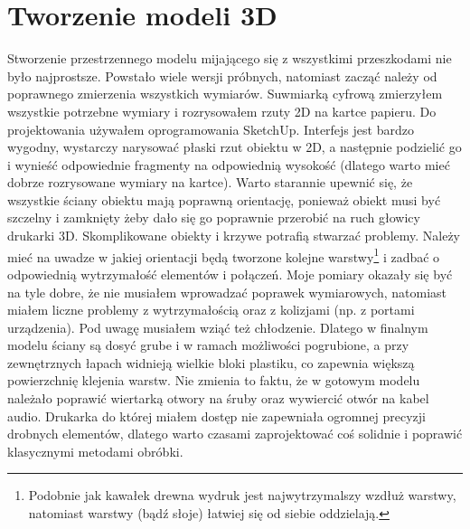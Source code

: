 \documentclass[declaration,shortabstract, inz]{iithesis}
\begin{document}
    
\section{Tworzenie modeli 3D}
\label{section:3d}
    Stworzenie przestrzennego modelu mijającego się z wszystkimi przeszkodami nie było najprostsze. Powstało wiele wersji próbnych, natomiast zacząć należy od poprawnego zmierzenia wszystkich wymiarów. Suwmiarką cyfrową zmierzyłem wszystkie potrzebne wymiary i rozrysowałem rzuty 2D na kartce papieru. Do projektowania używałem oprogramowania SketchUp. Interfejs jest bardzo wygodny, wystarczy narysować płaski rzut obiektu w 2D, a następnie podzielić go i wynieść odpowiednie fragmenty na odpowiednią wysokość (dlatego warto mieć dobrze rozrysowane wymiary na kartce). Warto starannie upewnić się, że wszystkie ściany obiektu mają poprawną orientację, ponieważ obiekt musi być szczelny i zamknięty żeby dało się go poprawnie przerobić na ruch głowicy drukarki 3D. Skomplikowane obiekty i krzywe potrafią stwarzać problemy. Należy mieć na uwadze w jakiej orientacji będą tworzone kolejne warstwy\footnote{Podobnie jak kawałek drewna wydruk jest najwytrzymalszy wzdłuż warstwy, natomiast warstwy (bądź słoje) łatwiej się od siebie oddzielają.} i zadbać o odpowiednią wytrzymałość elementów i połączeń. Moje pomiary okazały się być na tyle dobre, że nie musiałem wprowadzać poprawek wymiarowych, natomiast miałem liczne problemy z wytrzymałością oraz z kolizjami (np. z portami urządzenia). Pod uwagę musiałem wziąć też chłodzenie. Dlatego w finalnym modelu ściany są dosyć grube i w ramach możliwości pogrubione, a przy zewnętrznych łapach widnieją wielkie bloki plastiku, co zapewnia większą powierzchnię klejenia warstw. Nie zmienia to faktu, że w gotowym modelu należało poprawić wiertarką otwory na śruby oraz wywiercić otwór na kabel audio. Drukarka do której miałem dostęp nie zapewniała ogromnej precyzji drobnych elementów, dlatego warto czasami zaprojektować coś solidnie i poprawić klasycznymi metodami obróbki.
\end{document}
